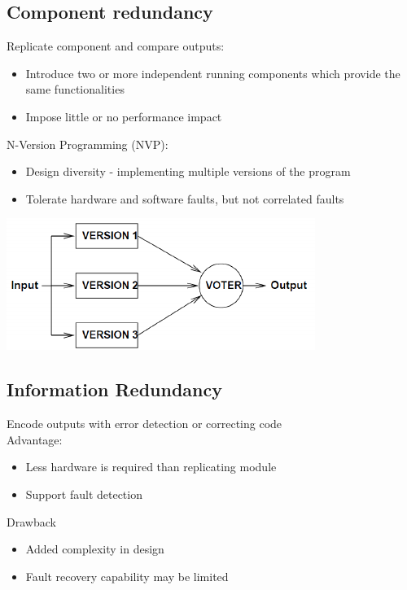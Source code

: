 \documentclass{article}[18pt]
\begin{document}
\subsection{Component redundancy}
Replicate component and compare outputs:
\begin{itemize}
	\item Introduce two or more independent running components which provide the same functionalities
	\item Impose little or no performance impact
\end{itemize}
N-Version Programming (NVP):
\begin{itemize}
	\item Design diversity - implementing multiple versions of the program
	\item Tolerate hardware and software faults, but not correlated faults
\end{itemize}
\begin{center}
	\includegraphics[scale=0.7]{"Component Redundancy"}
\end{center}
\subsection{Information Redundancy}
Encode outputs with error detection or correcting code\\
Advantage:
\begin{itemize}
	\item Less hardware is required than replicating module
	\item Support fault detection
\end{itemize}
Drawback
\begin{itemize}
	\item Added complexity in design
	\item Fault recovery capability may be limited
\end{itemize}
\end{document}
